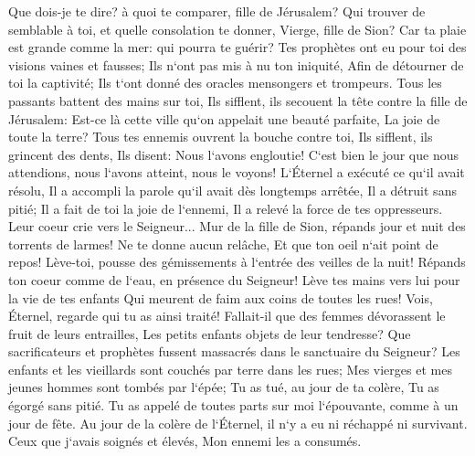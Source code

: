 \verse Que dois-je te dire? à quoi te comparer, fille de Jérusalem? Qui trouver de semblable à toi, et quelle consolation te donner, Vierge, fille de Sion? Car ta plaie est grande comme la mer: qui pourra te guérir? 
\verse Tes prophètes ont eu pour toi des visions vaines et fausses; Ils n`ont pas mis à nu ton iniquité, Afin de détourner de toi la captivité; Ils t`ont donné des oracles mensongers et trompeurs. 
\verse Tous les passants battent des mains sur toi, Ils sifflent, ils secouent la tête contre la fille de Jérusalem: Est-ce là cette ville qu`on appelait une beauté parfaite, La joie de toute la terre? 
\verse Tous tes ennemis ouvrent la bouche contre toi, Ils sifflent, ils grincent des dents, Ils disent: Nous l`avons engloutie! C`est bien le jour que nous attendions, nous l`avons atteint, nous le voyons! 
\verse L`Éternel a exécuté ce qu`il avait résolu, Il a accompli la parole qu`il avait dès longtemps arrêtée, Il a détruit sans pitié; Il a fait de toi la joie de l`ennemi, Il a relevé la force de tes oppresseurs. 
\verse Leur coeur crie vers le Seigneur... Mur de la fille de Sion, répands jour et nuit des torrents de larmes! Ne te donne aucun relâche, Et que ton oeil n`ait point de repos! 
\verse Lève-toi, pousse des gémissements à l`entrée des veilles de la nuit! Répands ton coeur comme de l`eau, en présence du Seigneur! Lève tes mains vers lui pour la vie de tes enfants Qui meurent de faim aux coins de toutes les rues! 
\verse Vois, Éternel, regarde qui tu as ainsi traité! Fallait-il que des femmes dévorassent le fruit de leurs entrailles, Les petits enfants objets de leur tendresse? Que sacrificateurs et prophètes fussent massacrés dans le sanctuaire du Seigneur? 
\verse Les enfants et les vieillards sont couchés par terre dans les rues; Mes vierges et mes jeunes hommes sont tombés par l`épée; Tu as tué, au jour de ta colère, Tu as égorgé sans pitié. 
\verse Tu as appelé de toutes parts sur moi l`épouvante, comme à un jour de fête. Au jour de la colère de l`Éternel, il n`y a eu ni réchappé ni survivant. Ceux que j`avais soignés et élevés, Mon ennemi les a consumés. 

